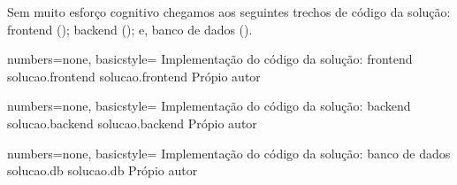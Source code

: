   Sem muito esforço cognitivo chegamos aos seguintes trechos de código da solução: frontend (); backend (); e, banco de dados ().

  \codigo
    {numbers=none, basicstyle=\ttfamily\tiny}
    {Implementação do código da solução: frontend}
    {solucao.frontend}
    {solucao.frontend}
    {Própio autor}

  \codigo
    {numbers=none, basicstyle=\ttfamily\tiny}
    {Implementação do código da solução: backend}
    {solucao.backend}
    {solucao.backend}
    {Própio autor}

  \codigo
    {numbers=none, basicstyle=\ttfamily\tiny}
    {Implementação do código da solução: banco de dados}
    {solucao.db}
    {solucao.db}
    {Própio autor}
